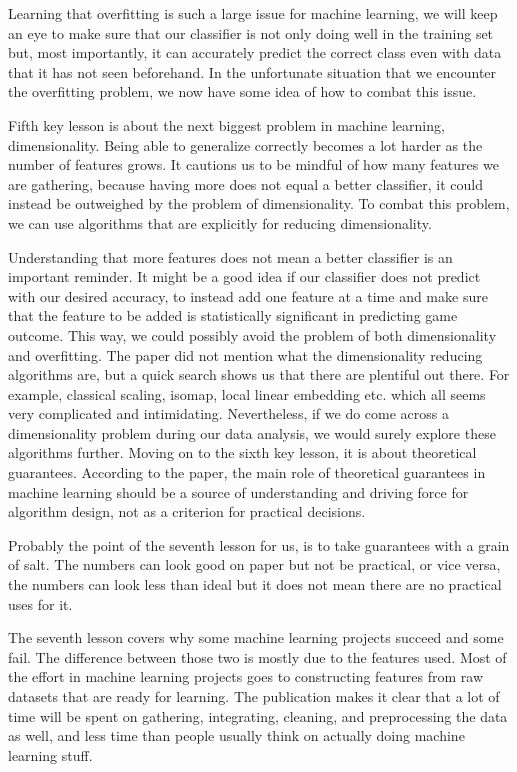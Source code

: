 \documentclass[a4paper,12pt]{report}
\begin{document}
Learning that overfitting is such a large issue for machine learning, we will keep an eye to make sure that our classifier is not only doing well in the training set but, most importantly, it can accurately predict the correct class even with data that it has not seen beforehand. In the unfortunate situation that we encounter the overfitting problem, we now have some idea of how to combat this issue.

Fifth key lesson is about the next biggest problem in machine learning, dimensionality. Being able to generalize correctly becomes a lot harder as the number of features grows. It cautions us to be mindful of how many features we are gathering, because having more does not equal a better classifier, it could instead be outweighed by the problem of dimensionality. To combat this problem, we can use algorithms that are explicitly for reducing dimensionality.

Understanding that more features does not mean a better classifier is an important reminder. It might be a good idea if our classifier does not predict with our desired accuracy, to instead add one feature at a time and make sure that the feature to be added is statistically significant in predicting game outcome. This way, we could possibly avoid the problem of both dimensionality and overfitting. The paper did not mention what the dimensionality reducing algorithms are, but a quick search shows us that there are plentiful out there. For example, classical scaling, isomap, local linear embedding etc. which all seems very complicated and intimidating. Nevertheless, if we do come across a dimensionality problem during our data analysis, we would surely explore these algorithms further.
Moving on to the sixth key lesson, it is about theoretical guarantees. According to the paper, the main role of theoretical guarantees in machine learning should be a source of understanding and driving force for algorithm design, not as a criterion for practical decisions.

Probably the point of the seventh lesson for us, is to take guarantees with a grain of salt. The numbers can look good on paper but not be practical, or vice versa, the numbers can look less than ideal but it does not mean there are no practical uses for it.

The seventh lesson covers why some machine learning projects succeed and some fail. The difference between those two is mostly due to the features used. Most of the effort in machine learning projects goes to constructing features from raw datasets that are ready for learning. The publication makes it clear that a lot of time will be spent on gathering, integrating, cleaning, and preprocessing the data as well, and less time than people usually think on actually doing machine learning stuff.
\end{document}
